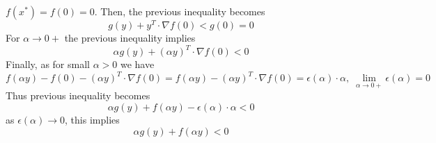 \documentclass[8pt]{article} %
\begin{document}
\begin{enumerate}[label=\bfseries Problem \arabic*.]
\begin{enumerate}[label=(\alph*)]
				$f(x^*)=f(0)=0$. Then, the previous inequality becomes
				\[g(y)+y^T\cdot\nabla f(0)<g(0)=0\]
				For $\alpha\to0+$ the previous inequality implies
				\[\alpha g( y)+(\alpha y)^T\cdot\nabla f(0)<0\]
				Finally, as for small $\alpha>0$ we have
				\[f(\alpha y)-f(0)-(\alpha y)^T\cdot\nabla f(0)=
				f(\alpha y)-(\alpha y)^T\cdot\nabla f(0)=\epsilon(\alpha)\cdot
				{\alpha},\;\lim_{\alpha\to0+}\epsilon(\alpha)=0\]
				Thus previous inequality becomes
				\[\alpha g( y)+f(\alpha y)-\epsilon(\alpha)\cdot{\alpha}<0\]
				as $\epsilon(\alpha)\to 0$, this implies
				\[\alpha g( y)+f(\alpha y)<0\]
		\end{enumerate}
\end{enumerate}
\end{document}

